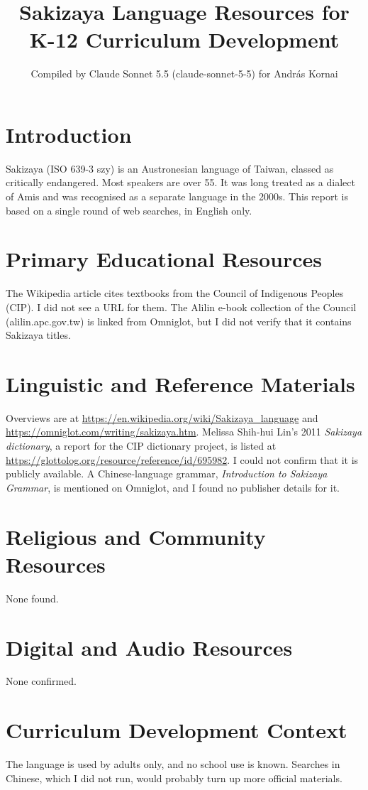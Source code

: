 \documentclass[12pt]{article}
\title{Sakizaya Language Resources for K-12 Curriculum Development}
\author{Compiled by Claude Sonnet 5.5 (claude-sonnet-5-5) for Andr\'as Kornai}
\date{}
\begin{document}
\maketitle

\section{Introduction}
Sakizaya (ISO 639-3 szy) is an Austronesian language of Taiwan, classed as critically endangered. Most speakers are over 55. It was long treated as a dialect of Amis and was recognised as a separate language in the 2000s. This report is based on a single round of web searches, in English only.

\section{Primary Educational Resources}
The Wikipedia article cites textbooks from the Council of Indigenous Peoples (CIP). I did not see a URL for them. The Alilin e-book collection of the Council (alilin.apc.gov.tw) is linked from Omniglot, but I did not verify that it contains Sakizaya titles.

\section{Linguistic and Reference Materials}
Overviews are at \url{https://en.wikipedia.org/wiki/Sakizaya_language} and \url{https://omniglot.com/writing/sakizaya.htm}. Melissa Shih-hui Lin's 2011 \emph{Sakizaya dictionary}, a report for the CIP dictionary project, is listed at \url{https://glottolog.org/resource/reference/id/695982}. I could not confirm that it is publicly available. A Chinese-language grammar, \emph{Introduction to Sakizaya Grammar}, is mentioned on Omniglot, and I found no publisher details for it.

\section{Religious and Community Resources}
None found.

\section{Digital and Audio Resources}
None confirmed.

\section{Curriculum Development Context}
The language is used by adults only, and no school use is known. Searches in Chinese, which I did not run, would probably turn up more official materials.
\end{document}

